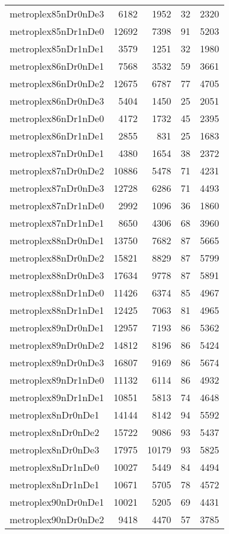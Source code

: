 \begin{longtable}{lrrrr}
metroplex85nDr0nDe3 & 6182 & 1952 & 32 & 2320 \\
metroplex85nDr1nDe0 & 12692 & 7398 & 91 & 5203 \\
metroplex85nDr1nDe1 & 3579 & 1251 & 32 & 1980 \\
metroplex86nDr0nDe1 & 7568 & 3532 & 59 & 3661 \\
metroplex86nDr0nDe2 & 12675 & 6787 & 77 & 4705 \\
metroplex86nDr0nDe3 & 5404 & 1450 & 25 & 2051 \\
metroplex86nDr1nDe0 & 4172 & 1732 & 45 & 2395 \\
metroplex86nDr1nDe1 & 2855 & 831 & 25 & 1683 \\
metroplex87nDr0nDe1 & 4380 & 1654 & 38 & 2372 \\
metroplex87nDr0nDe2 & 10886 & 5478 & 71 & 4231 \\
metroplex87nDr0nDe3 & 12728 & 6286 & 71 & 4493 \\
metroplex87nDr1nDe0 & 2992 & 1096 & 36 & 1860 \\
metroplex87nDr1nDe1 & 8650 & 4306 & 68 & 3960 \\
metroplex88nDr0nDe1 & 13750 & 7682 & 87 & 5665 \\
metroplex88nDr0nDe2 & 15821 & 8829 & 87 & 5799 \\
metroplex88nDr0nDe3 & 17634 & 9778 & 87 & 5891 \\
metroplex88nDr1nDe0 & 11426 & 6374 & 85 & 4967 \\
metroplex88nDr1nDe1 & 12425 & 7063 & 81 & 4965 \\
metroplex89nDr0nDe1 & 12957 & 7193 & 86 & 5362 \\
metroplex89nDr0nDe2 & 14812 & 8196 & 86 & 5424 \\
metroplex89nDr0nDe3 & 16807 & 9169 & 86 & 5674 \\
metroplex89nDr1nDe0 & 11132 & 6114 & 86 & 4932 \\
metroplex89nDr1nDe1 & 10851 & 5813 & 74 & 4648 \\
metroplex8nDr0nDe1 & 14144 & 8142 & 94 & 5592 \\
metroplex8nDr0nDe2 & 15722 & 9086 & 93 & 5437 \\
metroplex8nDr0nDe3 & 17975 & 10179 & 93 & 5825 \\
metroplex8nDr1nDe0 & 10027 & 5449 & 84 & 4494 \\
metroplex8nDr1nDe1 & 10671 & 5705 & 78 & 4572 \\
metroplex90nDr0nDe1 & 10021 & 5205 & 69 & 4431 \\
metroplex90nDr0nDe2 & 9418 & 4470 & 57 & 3785 \\

\end{longtable}
